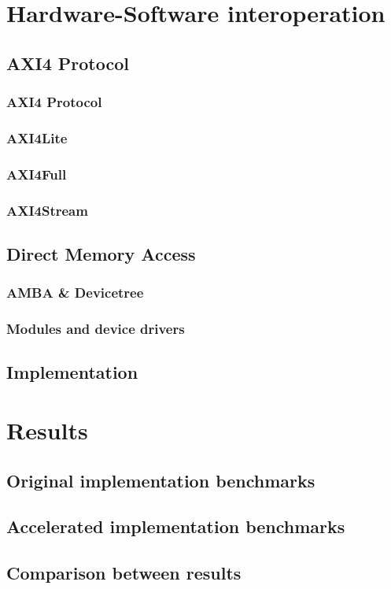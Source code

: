 \documentclass{iccmemoria}
\begin{document}
\chapter{Hardware-Software interoperation}
\section{AXI4 Protocol}
  \subsection{AXI4 Protocol}
  \subsection{AXI4Lite}
  \subsection{AXI4Full}
  \subsection{AXI4Stream}
\section{Direct Memory Access}
  \subsection{AMBA \& Devicetree}
  \subsection{Modules and device drivers}
\section{Implementation}

\chapter{Results}
\section{Original implementation benchmarks}
\section{Accelerated implementation benchmarks}
\section{Comparison between results}
\end{document}
